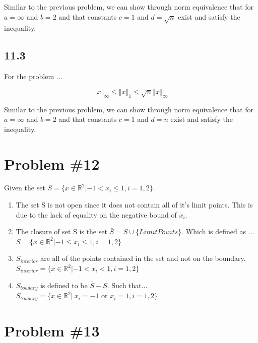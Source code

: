 \documentclass[12px]{article}
\newcommand{\R}{\mathbb{R}}
\begin{document}
\noindent Similar to the previous problem, we can show through norm equivalence that for $a=\infty$ and $b=2$ and that constants $c=1$ and $d=\sqrt{n}$ exist and satisfy the inequality.

\subsection*{11.3}

For the problem ...

$$ \left\Vert x \right\Vert_{\infty} \leq \left\Vert x \right\Vert_{1} \leq \sqrt{n} \left\Vert x \right\Vert_{\infty} $$

\noindent Similar to the previous problem, we can show through norm equivalence that for $a=\infty$ and $b=2$ and that constants $c=1$ and $d=n$ exist and satisfy the inequality.


\section{Problem \#12}

Given the set $S = \{x \in \R^2 | -1 < x_{i} \leq 1, i = 1,2\}$.

\begin{enumerate}
    \item The set S is not open since it does not contain all of it's limit points. This is due to the lack of equality on the negative bound of $x_i$.
    \item The closure of set S is the set $\bar{S} = S \cup \{ Limit Points \}$. Which is defined as ...\\  $\bar{S} = \{ x\in \R^2 | -1 \leq x_{i} \leq 1, i = 1,2 \}$

    \item $ S_{interior}$ are all of the points contained in the set and not on the boundary. \\

    $S_{interior} = \{ x \in \R^2 | -1 < x_{i} < 1, i = 1,2 \}$

    \item $S_{boudary}$ is defined to be $\bar{S} - S$. Such that... \\
    $S_{boudary} = \{ x\in\R^2 | \: x_{i} = -1 \text{ or } x_{i} =1, i = 1,2 \}$
\end{enumerate}

\section{Problem \#13}
\end{document}

